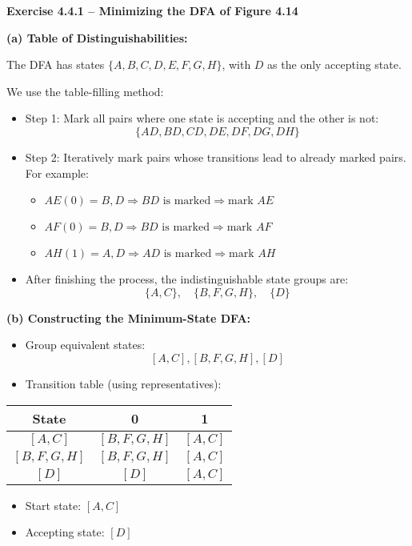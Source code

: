 \documentclass{article}
\theoremstyle{theorem}
\theoremstyle{definition}
\theoremstyle{remark}
\begin{document}
\textbf{Exercise 4.4.1 – Minimizing the DFA of Figure 4.14}

\textbf{(a) Table of Distinguishabilities:}

The DFA has states $\{A, B, C, D, E, F, G, H\}$, with $D$ as the only accepting state.

We use the table-filling method:
\begin{itemize}
    \item Step 1: Mark all pairs where one state is accepting and the other is not:
    \[
    \{AD, BD, CD, DE, DF, DG, DH\}
    \]
    \item Step 2: Iteratively mark pairs whose transitions lead to already marked pairs. For example:
    \begin{itemize}
      \item \( AE(0) = B, D \Rightarrow BD \text{ is marked} \Rightarrow \text{mark } AE \)
      \item \( AF(0) = B, D \Rightarrow BD \text{ is marked} \Rightarrow \text{mark } AF \)
      \item \( AH(1) = A, D \Rightarrow AD \text{ is marked} \Rightarrow \text{mark } AH \)
    \end{itemize}
  
    \item After finishing the process, the indistinguishable state groups are:
    \[
    \{A, C\}, \quad \{B, F, G, H\}, \quad \{D\}
    \]
\end{itemize}

\textbf{(b) Constructing the Minimum-State DFA:}

\begin{itemize}
    \item Group equivalent states:
    \[
    [A,C], [B,F,G,H], [D]
    \]
    \item Transition table (using representatives):
\end{itemize}

\begin{center}
\begin{tabular}{c|c|c}
State & 0 & 1 \\
\hline
$[A,C]$ & $[B,F,G,H]$ & $[A,C]$ \\
$[B,F,G,H]$ & $[B,F,G,H]$ & $[A,C]$ \\
$[D]$ & $[D]$ & $[A,C]$ \\
\end{tabular}
\end{center}

\begin{itemize}
    \item Start state: $[A,C]$
    \item Accepting state: $[D]$
\end{itemize}
\end{document}

